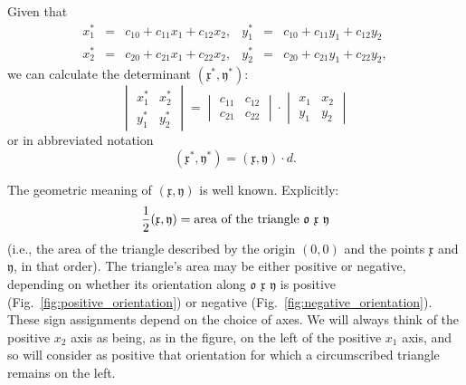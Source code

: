\documentclass[11pt]{book} \usepackage{amssymb}
\newcommand{\myvec}[1]{\mathfrak{#1}}
\newcommand{\vecx}{\myvec{x}}
\newcommand{\vecy}{\myvec{y}}
\begin{document}
Given that
\begin{equation}
  \label{eq:xy_affinity}
  \begin{array}{rclrcl}
    x_1^* &=& c_{10}+c_{11}x_1+c_{12}x_2, &y_1^* &=& c_{10}+c_{11}y_1+c_{12}y_2\\
    x_2^* &=& c_{20}+c_{21}x_1+c_{22}x_2, &y_2^* &=& c_{20}+c_{21}y_1+c_{22}y_2,
  \end{array}  
\end{equation}
we can calculate the determinant $(\vecx^*,\vecy^*)$:
\begin{equation}
  \label{eq:xy_det_transformed}
  \begin{vmatrix}x_1^*&x_2^*\\y_1^*&y_2^*\end{vmatrix}=\begin{vmatrix}c_{11}&c_{12}\\c_{21}&c_{22}\end{vmatrix}\cdot\begin{vmatrix}x_1&x_2\\y_1&y_2\end{vmatrix}
\end{equation}
or in abbreviated notation
\begin{equation}
  \label{eq:xy_det_transformed_short}
  (\vecx^*,\vecy^*)=(\vecx,\vecy)\cdot d.
\end{equation}

The geometric meaning of $(\vecx,\vecy)$ is well known. Explicitly:
\begin{equation}
  \label{eq:triangle_area}
  {1\over 2}(\vecx,\vecy)=\mbox{area of the triangle $\myvec{o}$ $\vecx$ $\vecy$}
\end{equation}
(i.e., the area of the triangle described by the origin $(0,0)$ and the 
points $\vecx$ and $\vecy$, in that order). The triangle's area may
be either positive or negative, depending on whether its orientation 
along $\myvec{o}$ $\vecx$ $\vecy$ is
positive (Fig.~\ref{fig:positive_orientation}) or negative 
(Fig.~\ref{fig:negative_orientation}). These sign assignments depend on the
choice of axes. We will always think of the positive $x_2$ axis as being,
as in the figure, on the left of the positive $x_1$ axis, and so will consider 
as positive that orientation for which a circumscribed triangle remains on 
the left.
\end{document}
